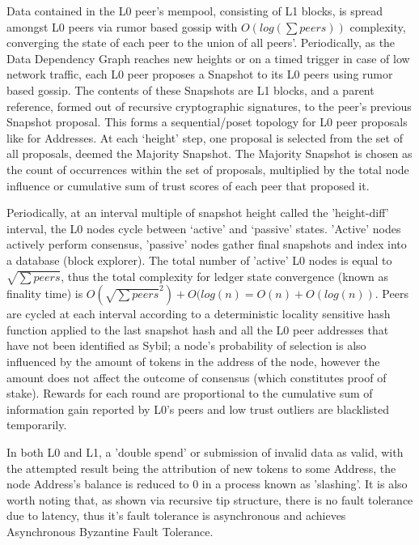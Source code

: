 \documentclass{article}
\theoremstyle{definition}
\theoremstyle{remark}
\theoremstyle{plain}
\begin{document}
Data contained in the L0 peer's mempool, consisting of L1 blocks, is spread amongst L0 peers via rumor based gossip with $O(log(\sum peers))$ complexity, converging the state of each peer to the union of all peers'. Periodically, as the Data Dependency Graph reaches new heights or on a timed trigger in case of low network traffic, each L0 peer proposes a Snapshot to its L0 peers using rumor based gossip. The contents of these Snapshots are L1 blocks, and a parent reference, formed out of recursive cryptographic signatures, to the peer’s previous Snapshot proposal. This forms a sequential/poset topology for L0 peer proposals like for Addresses. At each ‘height’ step, one proposal is selected from the set of all proposals, deemed the Majority Snapshot. The Majority Snapshot is chosen as the count of occurrences within the set of proposals, multiplied by the total  node influence or cumulative sum of trust scores of each peer that proposed it. 
	
Periodically, at an interval multiple of snapshot height called the 'height-diff' interval, the L0 nodes cycle between ‘active’ and ‘passive’ states. 'Active' nodes actively perform consensus, 'passive' nodes gather final snapshots and index into a database (block explorer). The total number of 'active' L0 nodes is equal to $\sqrt{\sum peers}$, thus the total complexity for ledger state convergence (known as finality time) is $O(\sqrt{\sum peers}^2) + O(log(n)= O(n) + O(log(n))$. Peers are cycled at each interval according to a deterministic locality sensitive hash function applied to the last snapshot hash and all the L0 peer addresses that have not been identified as Sybil; a node's probability of selection is also influenced by the amount of tokens in the address of the node, however the amount does not affect the outcome of consensus (which constitutes proof of stake). Rewards for each round are proportional to the cumulative sum of information gain reported by L0’s peers and low trust outliers are blacklisted temporarily.

In both L0 and L1, a 'double spend' or submission of invalid data as valid, with the attempted result being the attribution of new tokens to some Address, the node Address's balance is reduced to 0 in a process known as 'slashing'. It is also worth noting that, as shown via recursive tip structure, there is no fault tolerance due to latency, thus it's fault tolerance is asynchronous and achieves Asynchronous Byzantine Fault Tolerance.
\end{document}
